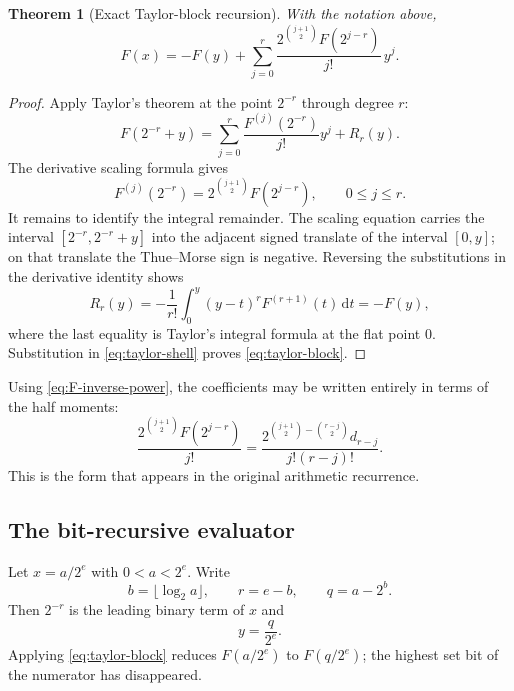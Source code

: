 \documentclass[11pt,oneside]{article}
\newtheorem{theorem}{Theorem}[section]
\theoremstyle{definition}
\theoremstyle{remark}
\newcommand{\dd}{\,\mathrm d}
\begin{document}
\begin{theorem}[Exact Taylor-block recursion]
With the notation above,
\begin{equation}
 F(x)=-F(y)+\sum_{j=0}^{r}
 \frac{2^{\binom{j+1}{2}}F(2^{j-r})}{j!}\,y^j.            \label{eq:taylor-block}
\end{equation}
\end{theorem}

\begin{proof}
Apply Taylor's theorem at the point $2^{-r}$ through degree $r$:
\begin{equation}
 F(2^{-r}+y)=\sum_{j=0}^{r}\frac{F^{(j)}(2^{-r})}{j!}y^j+R_r(y). \label{eq:taylor-shell}
\end{equation}
The derivative scaling formula gives
\begin{equation}
 F^{(j)}(2^{-r})
 =2^{\binom{j+1}{2}}F(2^{j-r}),\qquad 0\le j\le r.         \label{eq:shell-derivatives}
\end{equation}
It remains to identify the integral remainder.  The scaling equation carries the interval
$[2^{-r},2^{-r}+y]$ into the adjacent signed translate of the interval $[0,y]$; on that
translate the Thue--Morse sign is negative.  Reversing the substitutions in the derivative
identity shows
\begin{equation*}
 R_r(y)=-\frac1{r!}\int_0^y(y-t)^rF^{(r+1)}(t)\dd t=-F(y),
\end{equation*}
where the last equality is Taylor's integral formula at the flat point $0$.  Substitution in
\eqref{eq:taylor-shell} proves \eqref{eq:taylor-block}.
\end{proof}

Using \eqref{eq:F-inverse-power}, the coefficients may be written entirely in terms of the
half moments:
\begin{equation}
 \frac{2^{\binom{j+1}{2}}F(2^{j-r})}{j!}
 =\frac{2^{\binom{j+1}{2}-\binom{r-j}{2}}d_{r-j}}
 {j!(r-j)!}.                                               \label{eq:taylor-block-d}
\end{equation}
This is the form that appears in the original arithmetic recurrence.

\subsection{The bit-recursive evaluator}

Let $x=a/2^e$ with $0<a<2^e$.  Write
\begin{equation}
 b=\lfloor\log_2a\rfloor,
 \qquad r=e-b,
 \qquad q=a-2^b.                                          \label{eq:bit-split}
\end{equation}
Then $2^{-r}$ is the leading binary term of $x$ and
\begin{equation}
 y=\frac{q}{2^e}.                                         \label{eq:bit-remainder}
\end{equation}
Applying \eqref{eq:taylor-block} reduces $F(a/2^e)$ to $F(q/2^e)$; the highest set bit of
the numerator has disappeared.
\end{document}
